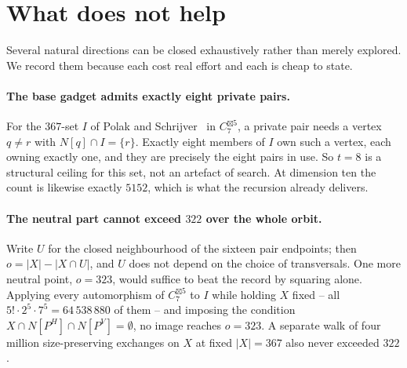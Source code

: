 \documentclass[11pt]{article}
\theoremstyle{definition}
\begin{document}
\section{What does not help}

Several natural directions can be closed exhaustively rather than merely explored. We record them
because each cost real effort and each is cheap to state.

\paragraph{The base gadget admits exactly eight private pairs.}
For the $367$-set $I$ of Polak and Schrijver~\cite{PS} in $C_7^{\boxtimes 5}$, a private pair needs a vertex
$q \neq r$ with $N[q] \cap I = \{r\}$. Exactly eight members of $I$ own such a vertex, each owning
exactly one, and they are precisely the eight pairs in use. So $t = 8$ is a structural ceiling for
this set, not an artefact of search. At dimension ten the count is likewise exactly $5152$, which
is what the recursion already delivers.

\paragraph{The neutral part cannot exceed $322$ over the whole orbit.}
Write $U$ for the closed neighbourhood of the sixteen pair endpoints; then $o = |X| - |X \cap U|$,
and $U$ does not depend on the choice of transversals. One more neutral point, $o = 323$, would
suffice to beat the record by squaring alone. Applying every automorphism of $C_7^{\boxtimes 5}$
to $I$ while holding $X$ fixed -- all $5! \cdot 2^5 \cdot 7^5 = 64\,538\,880$ of them -- and
imposing the condition $X \cap N[P^H] \cap N[P^V] = \emptyset$, no image reaches $o = 323$.
A separate walk of four million size-preserving exchanges on $X$ at fixed $|X| = 367$ also never
exceeded $322$.
\end{document}
